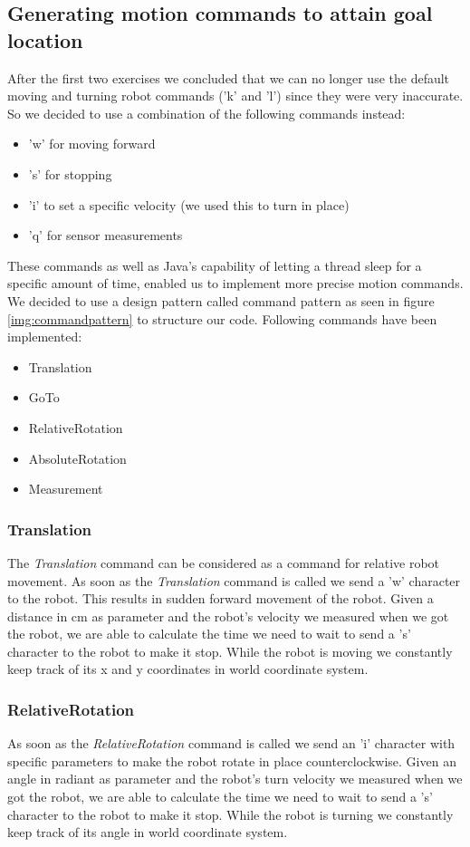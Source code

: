 \documentclass[703030]{iisreport}
\begin{document}
\subsection{Generating motion commands to attain goal location}
After the first two exercises we concluded that we can no longer use the default
moving and turning robot commands ('k' and 'l') since they were very inaccurate.
So we decided to use a combination of the following commands instead:
\begin{itemize}
	\item 'w' for moving forward
	\item 's' for stopping
	\item 'i' to set a specific velocity (we used this to turn in place)
	\item 'q' for sensor measurements
\end{itemize}
These commands as well as Java's capability of letting a thread sleep for a
specific amount of time, enabled us to implement more precise motion commands.
We decided to use a design pattern called command pattern as seen in figure
\ref{img:commandpattern} to structure our code.
Following commands have been implemented:
\begin{itemize}
	\item Translation
	\item GoTo
	\item RelativeRotation
	\item AbsoluteRotation
	\item Measurement
\end{itemize}

\subsubsection{Translation}
The \emph{Translation} command can be considered as a command for relative robot
movement. As soon as the \emph{Translation} command is called we send a 'w' character
to the robot. This results in sudden forward movement of the robot. Given a
distance in cm as parameter and the robot's velocity we measured when we got the
robot, we are able to calculate the time we need to wait to send a 's' character
to the robot to make it stop. While the robot is moving we constantly keep track
of its x and y coordinates in world coordinate system.

\subsubsection{RelativeRotation}
As soon as the \emph{RelativeRotation} command is called we send an 'i' character 
with specific parameters to make the robot rotate in place counterclockwise. Given 
an angle in radiant as parameter and the robot's turn velocity we measured when we
got the robot, we are able to calculate the time we need to wait to send a 's'
character to the robot to make it stop. While the robot is turning we constantly
keep track of its angle in world coordinate system.
\end{document}
